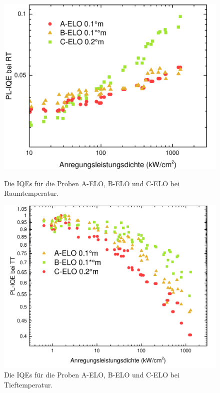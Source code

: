 \begin{figure}[ht]
  \centering
  \begin{minipage}[t]{0.49\textwidth}
    \centering
    \includegraphics[width=\textwidth]{Bilder/TS4045/corrIQERT.pdf}
		\caption{Die IQEs für die Proben A-ELO, B-ELO und C-ELO bei Raumtemperatur.}
    \label{fig:eloiqeRT}
  \end{minipage}
	\hfill
  \begin{minipage}[t]{0.49\textwidth}
    \centering
    \includegraphics[width=\linewidth]{Bilder/TS4045/IQETT.pdf}
		\caption{Die IQEs für die Proben A-ELO, B-ELO und C-ELO bei Tieftemperatur.}
    \label{fig:elocorriqeRT}
  \end{minipage}
\end{figure}
